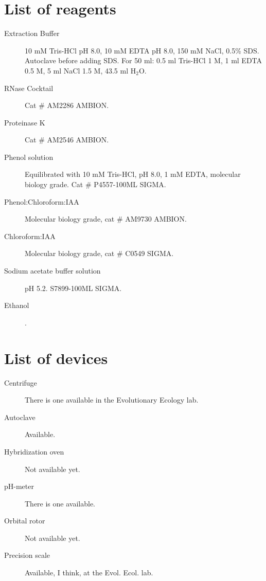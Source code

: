\documentclass{article}
\begin{document}
\section{List of reagents}
\begin{description}
   \item [Extraction Buffer] 10 mM Tris-HCl pH 8.0, 10 mM EDTA pH 8.0, 150 mM NaCl, 0.5\% SDS. Autoclave before adding SDS. For 50 ml: 0.5 ml Tris-HCl 1 M, 1 ml EDTA 0.5 M, 5 ml NaCl 1.5 M, 43.5 ml H$_2$O.
   \item [RNase Cocktail] Cat \# AM2286 AMBION.
   \item [Proteinase K] Cat \# AM2546 AMBION.
   \item [Phenol solution] Equilibrated with 10 mM Tris-HCl, pH 8.0, 1 mM EDTA, molecular biology grade. Cat \# P4557-100ML SIGMA.
   \item [Phenol:Chloroform:IAA] Molecular biology grade, cat \# AM9730 AMBION.
   \item [Chloroform:IAA] Molecular biology grade, cat \# C0549 SIGMA.
   \item [Sodium acetate buffer solution] pH 5.2. S7899-100ML SIGMA.
   \item [Ethanol].
\end{description}

\section{List of devices}
\begin{description}
   \item [Centrifuge] There is one available in the Evolutionary Ecology lab.
   \item [Autoclave] Available.
   \item [Hybridization oven] Not available yet.
   \item [pH-meter] There is one available.
   \item [Orbital rotor] Not available yet.
   \item [Precision scale] Available, I think, at the Evol. Ecol. lab.
\end{description}
\end{document}
